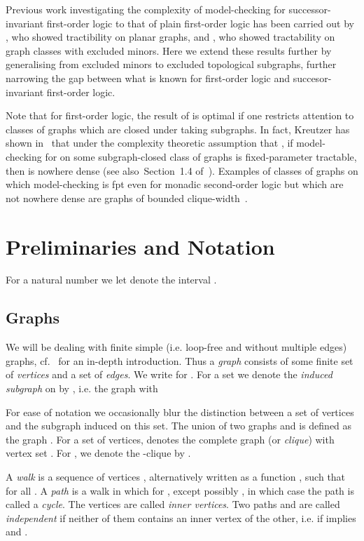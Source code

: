 \documentclass[12pt]{amsart}
\begin{document}
Previous work investigating the complexity of model-checking for
successor-invariant first-order logic to that of plain first-order
logic has been carried out by \cite{EngelmannKS12}, who showed
tractibility on planar graphs, and \cite{ekk13}, who showed
tractability on graph classes with excluded minors. Here we extend
these results further by generalising from excluded minors to excluded
topological subgraphs, further narrowing the gap between what is known
for first-order logic and succesor-invariant first-order logic.

Note that for first-order logic, the result of \cite{gks14} is optimal
if one restricts attention to classes of graphs which are closed under
taking subgraphs. In fact, Kreutzer has shown in~\cite{Kreutzer11}
that under the complexity theoretic assumption that , if model-checking for  on some subgraph-closed
class  of graphs is fixed-parameter tractable, then  is
nowhere dense (see also~Section~1.4 of~\cite{DvorakKT13}). Examples of
classes of graphs on which model-checking is fpt even for monadic
second-order logic but which are not nowhere dense are graphs of
bounded clique-width~\cite{CourcelleMakRot00}.


\section{Preliminaries and Notation}
\label{sec:prelim}

For a natural number  we let  denote the interval
.

\subsection{Graphs}
\label{sec:graphprelim}

We will be dealing with finite simple (i.e. loop-free and without
multiple edges) graphs, cf.~\cite{diestel,tutte} for an in-depth
introduction. Thus a \emph{graph}  consists of some finite
set  of \emph{vertices} and a set  of
\emph{edges}. We write  for . For a set  we denote the \emph{induced subgraph} on  by ,
i.e. the graph  with

For ease of notation we occasionally blur the distinction between a
set  of vertices and the subgraph induced on this set. The union  of two graphs  and  is defined as the
graph . For a set  of vertices,  denotes
the complete graph (or \emph{clique}) with vertex set . For , we denote the -clique  by .

A \emph{walk} is a sequence of vertices ,
alternatively written as a function , such that
 for all . A \emph{path} is a
walk in which  for , except possibly , in which case the path is called a \emph{cycle}. The vertices
 are called \emph{inner vertices}. Two paths
 and  are called
\emph{independent} if neither of them contains an inner vertex of the
other, i.e. if  implies  and .
\end{document}
